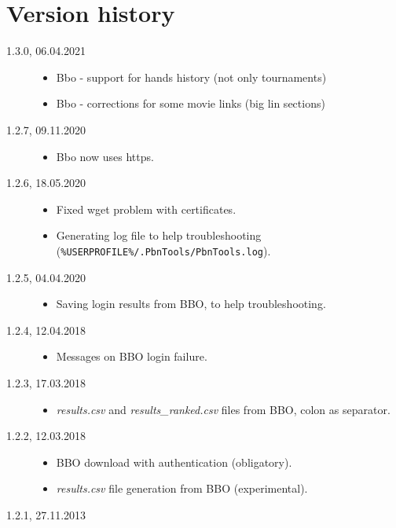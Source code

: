 \documentclass[polish,a4paper,11pt,oneside]{article}
\begin{document}
\section{Version history}
\begin{description}
\item[1.3.0, 06.04.2021]
  \begin{itemize}
  \item Bbo - support for hands history (not only tournaments)
  \item Bbo - corrections for some movie links (big lin sections)
  \end{itemize}
\item[1.2.7, 09.11.2020]
  \begin{itemize}
  \item Bbo now uses https.
  \end{itemize}
\item[1.2.6, 18.05.2020]
  \begin{itemize}
  \item Fixed wget problem with certificates.
  \item Generating log file to help troubleshooting
        (\verb!%USERPROFILE%/.PbnTools/PbnTools.log!).
  \end{itemize}
\item[1.2.5, 04.04.2020]
  \begin{itemize}
  \item Saving login results from BBO, to help troubleshooting.
  \end{itemize}
\item[1.2.4, 12.04.2018]
  \begin{itemize}
  \item Messages on BBO login failure.
  \end{itemize}
\item[1.2.3, 17.03.2018]
  \begin{itemize}
  \item {\em results.csv} and {\em results\_ranked.csv} files from BBO,
        colon as separator.
  \end{itemize}
\item[1.2.2, 12.03.2018]
  \begin{itemize}
  \item BBO download with authentication (obligatory).
  \item {\em results.csv} file generation from BBO (experimental).
  \end{itemize}
\item[1.2.1, 27.11.2013]
  \begin{itemize}

\end{itemize}
\end{description}
\end{document}
